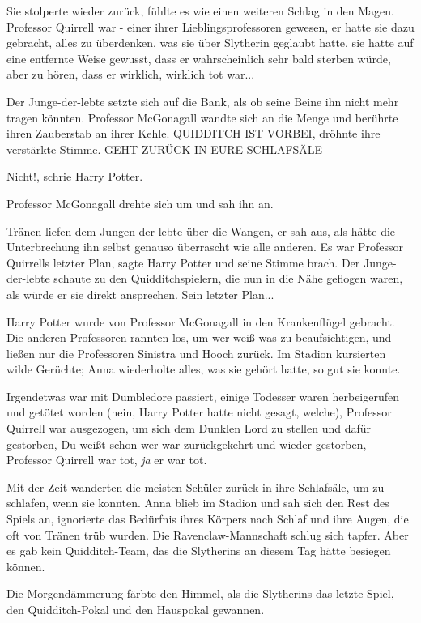 Sie stolperte wieder zurück, fühlte es wie einen weiteren Schlag in den Magen.
Professor Quirrell war - einer ihrer Lieblingsprofessoren gewesen, er hatte sie
dazu gebracht, alles zu überdenken, was sie über Slytherin geglaubt hatte, sie
hatte auf eine entfernte Weise gewusst, dass er wahrscheinlich sehr bald sterben
würde, aber zu hören, dass er wirklich, wirklich tot war...

Der Junge-der-lebte setzte sich auf die Bank, als ob seine Beine ihn nicht mehr
tragen könnten. Professor McGonagall wandte sich an die Menge und berührte ihren
Zauberstab an ihrer Kehle. \glqq{}QUIDDITCH IST VORBEI\grqq{}, dröhnte ihre
verstärkte Stimme. \glqq{}GEHT ZURÜCK IN EURE SCHLAFSÄLE -\grqq{}

\glqq{}Nicht!\grqq{}, schrie Harry Potter.

Professor McGonagall drehte sich um und sah ihn an.

Tränen liefen dem Jungen-der-lebte über die Wangen, er sah aus, als hätte die
Unterbrechung ihn selbst genauso überrascht wie alle anderen. \glqq{}Es war
Professor Quirrells letzter Plan\grqq{}, sagte Harry Potter und seine Stimme
brach. Der Junge-der-lebte schaute zu den Quidditchspielern, die nun in die Nähe
geflogen waren, als würde er sie direkt ansprechen. \glqq{}Sein letzter Plan...\grqq{}

Harry Potter wurde von Professor McGonagall in den Krankenflügel gebracht. Die
anderen Professoren rannten los, um wer-weiß-was zu beaufsichtigen, und ließen
nur die Professoren Sinistra und Hooch zurück. Im Stadion kursierten wilde
Gerüchte; Anna wiederholte alles, was sie gehört hatte, so gut sie konnte.

Irgendetwas war mit Dumbledore passiert, einige Todesser waren herbeigerufen und
getötet worden (nein, Harry Potter hatte nicht gesagt, welche), Professor
Quirrell war ausgezogen, um sich dem Dunklen Lord zu stellen und dafür
gestorben, Du-weißt-schon-wer war zurückgekehrt und wieder gestorben, Professor
Quirrell war tot, \emph{ja} er war tot.

Mit der Zeit wanderten die meisten Schüler zurück in ihre Schlafsäle, um zu
schlafen, wenn sie konnten. Anna blieb im Stadion und sah sich den Rest des
Spiels an, ignorierte das Bedürfnis ihres Körpers nach Schlaf und ihre Augen,
die oft von Tränen trüb wurden. Die Ravenclaw-Mannschaft schlug sich tapfer.
Aber es gab kein Quidditch-Team, das die Slytherins an diesem Tag hätte besiegen
können.

Die Morgendämmerung färbte den Himmel, als die Slytherins das letzte Spiel, den
Quidditch-Pokal und den Hauspokal gewannen.

